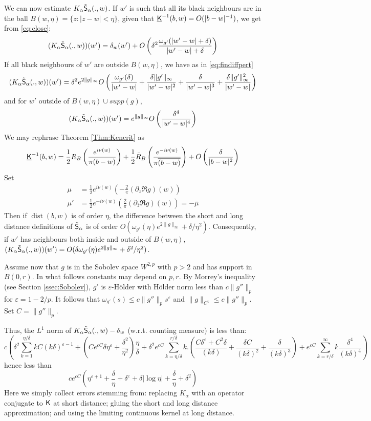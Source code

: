\documentclass[10pt]{article}
\newcommand{\eps}{\varepsilon}
\newcommand{\rK}{{\sf K}}
\newcommand{\uK}{{\underline {\sf K}}}
\newcommand{\rS}{{\sf S}}
\DeclareMathOperator{\dist}{dist}
\begin{document}
We can now estimate $K_\alpha\tilde\rS_\alpha(.,w)$. 
%
If $w'$ is such that all its black neighbours are in the ball $B(w,\eta)=\{z:|z-w|<\eta\}$, given that $\uK^{-1}(b,w)=O(|b-w|^{-1})$, we get from \eqref{eq:close}:
$$(K_\alpha\tilde\rS_\alpha(.,w))(w')=\delta_w(w')+O\left(\delta^2\frac{\omega_{g'}(|w'-w|+\delta)}{|w'-w|+\delta}\right)$$
If all black neighbours of $w'$ are outside $B(w,\eta)$, we have as in \eqref{eq:findiffpert}
$$(K_\alpha\tilde\rS_\alpha(.,w))(w')=\delta^2e^{2\|g\|_\infty}O\left(
\frac{\omega_{g'}(\delta)}{|w'-w|}+\frac{\delta\|g'\|_\infty}{|w'-w|^2}+\frac{\delta}{|w'-w|^3}+\frac{\delta\|g'\|_\infty^2}{|w'-w|}\right)$$
and for $w'$ outside of $B(w,\eta)\cup supp(g)$, 
$$(K_\alpha\tilde\rS_\alpha(.,w))(w')=e^{\|g\|_\infty}O\left(
\frac{\delta^4}{|w'-w|^4}\right)$$
We may rephrase Theorem \ref{Thm:Kencrit} as
$$\uK^{-1}(b,w)=\frac 12 R_B\left(\frac{e^{i\nu(w)}}{\pi(b-w)}\right)+
\frac 12 \bar R_B\left(\frac{e^{-i\nu(w)}}{\pi\overline{(b-w)}}\right)+O\left(\frac{\delta}{|b-w|^2}\right)$$
Set
\begin{align*}
\mu&=\frac 12 e^{i\nu(w)}(-\frac {2}\pi(\partial_z\Re g)(w))\\
\mu'&=\frac 12 e^{-i\nu(w)}(\frac {2}\pi(\partial_{\bar z}\Re g)(w))=-\bar\mu
\end{align*}
Then if $\dist(b,w)$ is of order $\eta$, the difference between the short and long distance definitions of $\tilde\rS_\alpha$ is of order $O(\omega_{g'}(\eta)e^{2\|g\|_\infty}+\delta/\eta^2)$. Consequently, if $w'$ has neighbours both inside and outside of $B(w,\eta)$, $(K_\alpha\tilde\rS_\alpha(.,w))(w')=O(\delta\omega_{g'}(\eta)e^{2\|g\|_\infty}+\delta^2/\eta^2)$. 

%
Assume now that $g$ is in the Sobolev space $W^{2,p}$ with $p>2$ and has support in $B(0,r)$. In what follows constants may depend on $p,r$. By Morrey's inequality (see Section \ref{ssec:Sobolev}), $g'$ is $\eps$-H\"older with H\"older norm less than $c\|g''\|_p$ for $\eps=1-2/p$. It follows that $\omega_{g'}(s)\leq c\|g''\|_ps^\eps$ and $\|g\|_{C^1}\leq c\|g''\|_p$. Set $C=\|g''\|_p$.


Thus, the $L^1$ norm of $K_\alpha\tilde\rS_\alpha(.,w)-\delta_w$ (w.r.t. counting measure) is less than:
$$c\left(\delta^2\sum_{k=1}^{\eta/\delta}kC(k\delta)^{\eps-1}+(Ce^{cC}\delta\eta^\eps+\frac{\delta^2}{\eta^2})\frac{\eta}{\delta}+\delta^2e^{cC}\sum_{k=\eta/\delta}^{r/\delta}k.\left(\frac{C\delta^{\eps}+C^2\delta}{(k\delta)}+\frac{\delta C}{(k\delta)^2}+\frac{\delta}{(k\delta)^3}\right)
+e^{cC}\sum_{k=r/\delta}^\infty k\frac{\delta^4}{(k\delta)^4}
\right)$$
hence less than
$$ce^{cC}(\eta^{\eps+1}+\frac{\delta}{\eta}+\delta^{\eps}+\delta|\log\eta|+\frac{\delta}{\eta}+\delta^2)$$
Here we simply collect errors stemming from: replacing $K_\alpha$ with an operator conjugate to $\rK$ at short distance; gluing the short and long distance approximation; and using the limiting continuous kernel at long distance.
\end{document}
